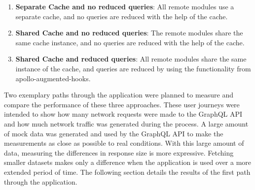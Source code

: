 \begin{enumerate}
  \item \textbf{Separate Cache and no reduced queries}: All remote modules use a separate cache, and no queries are reduced with the help of the cache.
  \item \textbf{Shared Cache and no reduced queries}: The remote modules share the same cache instance, and no queries are reduced with the help of the cache.
  \item \textbf{Shared Cache and reduced queries}: All remote modules share the same instance of the cache, and queries are reduced by using the functionality from apollo-augmented-hooks.
\end{enumerate}

\noindent Two exemplary paths through the application were planned to measure and compare the performance of these three approaches. These user journeys were intended to show how many network requests were made to the GraphQL \ac{API} and how much network traffic was generated during the process. A large amount of mock data was generated and used by the GraphQL \ac{API} to make the measurements as close as possible to real conditions. With this large amount of data, measuring the differences in response size is more expressive. Fetching smaller datasets makes only a difference when the application is used over a more extended period of time. The following section details the results of the first path through the application.






